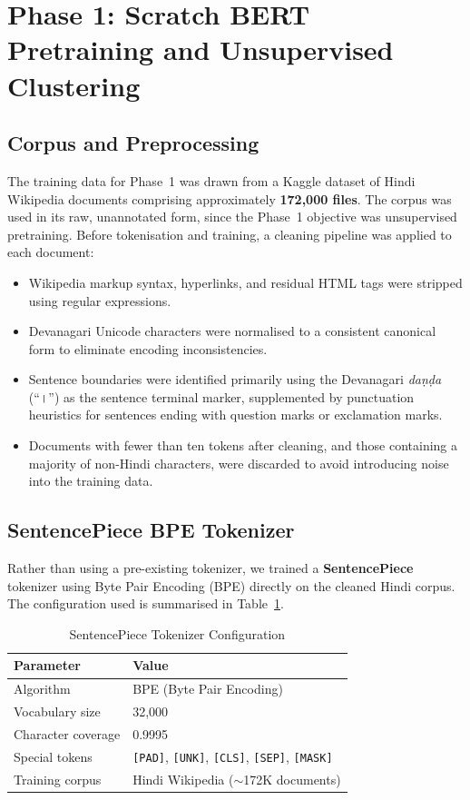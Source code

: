 \documentclass[12pt,a4paper]{report}
\begin{document}
\section{Phase 1: Scratch BERT Pretraining and Unsupervised Clustering}

\subsection{Corpus and Preprocessing}

The training data for Phase~1 was drawn from a Kaggle dataset of Hindi Wikipedia documents comprising approximately \textbf{172,000 files}. The corpus was used in its raw, unannotated form, since the Phase~1 objective was unsupervised pretraining. Before tokenisation and training, a cleaning pipeline was applied to each document:

\begin{itemize}
    \item Wikipedia markup syntax, hyperlinks, and residual HTML tags were stripped using regular expressions.
    \item Devanagari Unicode characters were normalised to a consistent canonical form to eliminate encoding inconsistencies.
    \item Sentence boundaries were identified primarily using the Devanagari \textit{daṇḍa} (``।'') as the sentence terminal marker, supplemented by punctuation heuristics for sentences ending with question marks or exclamation marks.
    \item Documents with fewer than ten tokens after cleaning, and those containing a majority of non-Hindi characters, were discarded to avoid introducing noise into the training data.
\end{itemize}

\subsection{SentencePiece BPE Tokenizer}

Rather than using a pre-existing tokenizer, we trained a \textbf{SentencePiece} tokenizer using Byte Pair Encoding (BPE) directly on the cleaned Hindi corpus. The configuration used is summarised in Table~\ref{tab:sp_config}.

\begin{table}[H]
\centering
\caption{SentencePiece Tokenizer Configuration}
\label{tab:sp_config}
\begin{tabular}{|l|l|}
\hline
\textbf{Parameter} & \textbf{Value} \\
\hline
Algorithm & BPE (Byte Pair Encoding) \\
Vocabulary size & 32,000 \\
Character coverage & 0.9995 \\
Special tokens & \texttt{[PAD]}, \texttt{[UNK]}, \texttt{[CLS]}, \texttt{[SEP]}, \texttt{[MASK]} \\
Training corpus & Hindi Wikipedia ($\sim$172K documents) \\
\hline
\end{tabular}
\end{table}
\end{document}
